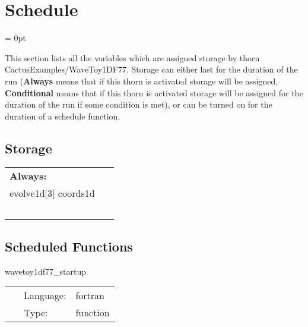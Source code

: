 
\section{Schedule} 


\parskip = 0pt


\noindent This section lists all the variables which are assigned storage by thorn CactusExamples/WaveToy1DF77.  Storage can either last for the duration of the run ({\bf Always} means that if this thorn is activated storage will be assigned, {\bf Conditional} means that if this thorn is activated storage will be assigned for the duration of the run if some condition is met), or can be turned on for the duration of a schedule function.


\subsection*{Storage}

\hspace{5mm}

 \begin{tabular*}{160mm}{ll} 

{\bf Always:}&  ~ \\ 
 evolve1d[3] coords1d & ~\\ 
~ & ~\\ 
\end{tabular*} 


\subsection*{Scheduled Functions}
\vspace{5mm}


\hspace{5mm} wavetoy1df77\_startup 

\hspace{5mm}{\it register wavetoy1df77 banner } 


\hspace{5mm}

 \begin{tabular*}{160mm}{cll} 
~ & Language:  & fortran \\ 
~ & Type:  & function \\ 
\end{tabular*} 


\vspace{5mm}


